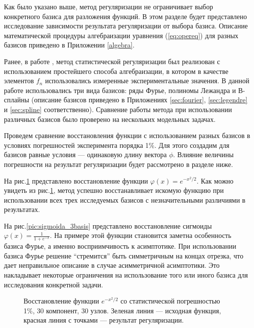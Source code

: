 Как было указано выше, метод регуляризации не ограничивает выбор конкретного базиса для разложения функций. В этом разделе будет представлено исследование зависимости результата регуляризации от выбора базиса. Описание математической процедуры алгебраизации уравнения (\ref{eq:opereq}) для разных базисов приведено в Приложении \ref{algebra}.

Ранее, в работе \cite{turovceva}, метод статистической регуляризации был реализован с использованием простейшего способа алгебраизации, в котором в качестве элементов $f_n$ использовались измеренные экспериментальные значения. В данной работе использовались три вида базисов: ряды Фурье, полиномы Лежандра и В-сплайны (описание базисов приведено в Приложениях \ref{sec:fourier}, \ref{sec:legendre} и \ref{sec:spline} соответственно). Сравнение работы метода при использовании различных базисов было проверено на нескольких модельных задачах.

Проведем сравнение восстановления функции с использованием разных базисов в условиях погрешностей эксперимента порядка 1\%. Для этого создадим для базисов равные условия --- одинаковую длину вектора $\phi$. Влияние величины погрешности на результат регуляризации будет рассмотрено в разделе ниже.

На рис.\ref{pic:gauss_3basis} представлено восстановление функции $\varphi(x)=e^{-x^2/2}$. Как можно увидеть из рис.\ref{pic:gauss_3basis}, метод успешно восстанавливает искомую функцию при использовании всех трех исследуемых базисов с незначительными различиями в результатах. 

На рис.\ref{pic:sigmoida_3basis} представлено восстановление сигмоиды $\varphi(x) = \frac{1}{1+e^{-x}}$. На примере этой функции становится заметна особенность базиса Фурье, а именно восприимчивость к асимптотике. При использовании базиса Фурье решение ``стремится'' быть симметричным на концах отрезка, что дает неправильное описание в случае асимметричной асимптотики. Это накладывает некоторые ограничения на использование того или иного базиса для исследования конкретной задачи.

\newpage
 \setlength{\textfloatsep}{10pt plus 1.0pt minus 2.0pt}
\setlength{\floatsep}{5pt plus 1.0pt minus 1.0pt}
\setlength{\intextsep}{5pt plus 1.0pt minus 1.0pt}

\begin{figure}[htbp! ]
	\caption{Восстановление функции $e^{-x^2/2}$ со статистической погрешностью 1\%, 30 компонент, 30 узлов. Зеленая линия --- исходная функция, красная линия с точками --- результат регуляризации.}
	\label{pic:gauss_3basis}
\end{figure}

